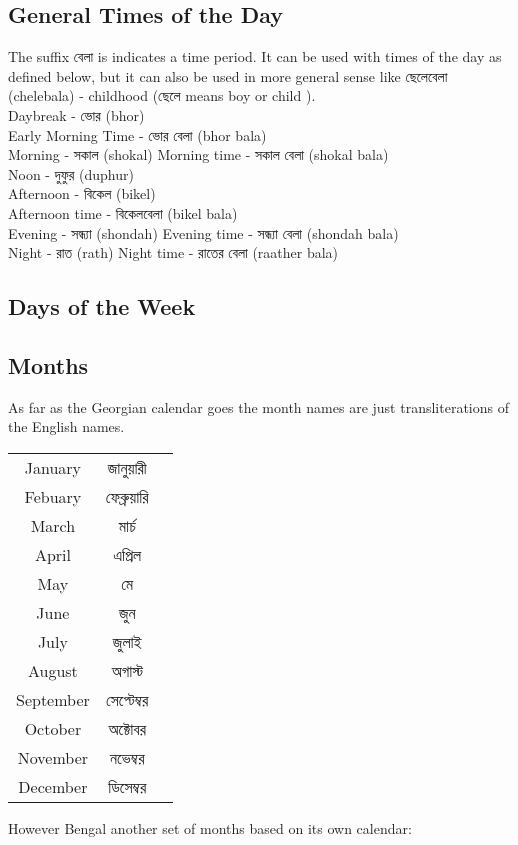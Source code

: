\documentclass{article}
\begin{document}
\subsection{General Times of the Day}
The suffix বেলা is indicates a time period. It can be used with times of the day as defined below, but it can also be used in more general sense like ছেলেবেলা (chelebala) - childhood (ছেলে means boy or child ). \\

Daybreak - ভোর (bhor) \\
Early Morning Time - ভোর বেলা (bhor bala) \\
Morning - সকাল (shokal)
Morning time -  সকাল বেলা (shokal bala) \\
Noon - দুফুর (duphur) \\
Afternoon - বিকেল (bikel) \\
Afternoon time - বিকেলবেলা (bikel bala) \\
Evening - সন্ধ্যা (shondah)
Evening time - সন্ধ্যা বেলা (shondah bala) \\
Night - রাত (rath)
Night time - রাতের বেলা (raather bala)  \\

\subsection{Days of the Week}

\subsection{Months}

As far as the Georgian calendar goes the month names are just transliterations of the English names. \\


\begin{center}
\begin{tabular}{ c c c }
 January & জানুয়ারী  \\ 
 Febuary & ফেব্রুয়ারি  \\  
 March & মার্চ     \\
 April & এপ্রিল    \\
 May & মে    \\
 June & জুন    \\
 July & জুলাই   \\
 August & অগাস্ট  \\
 September & সেপ্টেম্বর  \\
 October & অক্টোবর  \\
 November & নভেম্বর  \\
 December & ডিসেম্বর  
\end{tabular}
\end{center}

However Bengal another set of months based on its own calendar: \\
\end{document}
